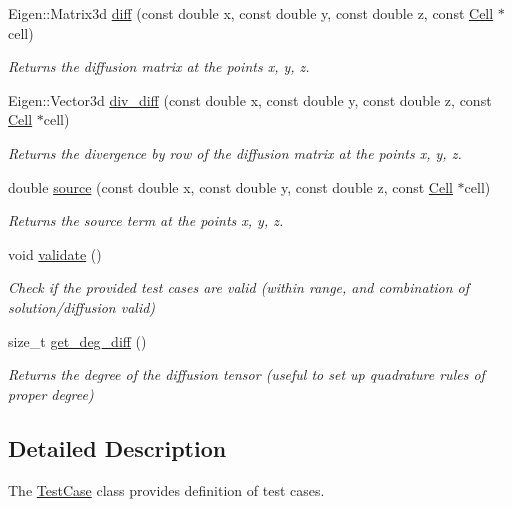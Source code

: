\begin{DoxyCompactItemize}
Eigen\+::\+Matrix3d \hyperlink{classTestCase_ae859f40ded10ed09eebc90f730954485}{diff} (const double x, const double y, const double z, const \hyperlink{classHArDCore3D_1_1Cell}{Cell} $\ast$cell)
\begin{DoxyCompactList}\small\item\em Returns the diffusion matrix at the points x, y, z. \end{DoxyCompactList}\item 
Eigen\+::\+Vector3d \hyperlink{classTestCase_ab716e30f77a05679480ab42c9d04b606}{div\+\_\+diff} (const double x, const double y, const double z, const \hyperlink{classHArDCore3D_1_1Cell}{Cell} $\ast$cell)
\begin{DoxyCompactList}\small\item\em Returns the divergence by row of the diffusion matrix at the points x, y, z. \end{DoxyCompactList}\item 
double \hyperlink{classTestCase_a7e745a0df9fcc771962c48145e230965}{source} (const double x, const double y, const double z, const \hyperlink{classHArDCore3D_1_1Cell}{Cell} $\ast$cell)
\begin{DoxyCompactList}\small\item\em Returns the source term at the points x, y, z. \end{DoxyCompactList}\item 
\mbox{\label{classTestCase_a1f428652eb476f6eb4973ef1f478e8ce}} 
void \hyperlink{classTestCase_a1f428652eb476f6eb4973ef1f478e8ce}{validate} ()
\begin{DoxyCompactList}\small\item\em Check if the provided test cases are valid (within range, and combination of solution/diffusion valid) \end{DoxyCompactList}\item 
size\+\_\+t \hyperlink{group__TestCases_ga3dd2daaebb012281b252ab65db0045b2}{get\+\_\+deg\+\_\+diff} ()
\begin{DoxyCompactList}\small\item\em Returns the degree of the diffusion tensor (useful to set up quadrature rules of proper degree) \end{DoxyCompactList}\end{DoxyCompactItemize}


\subsection{Detailed Description}
The \hyperlink{classTestCase}{Test\+Case} class provides definition of test cases. 

